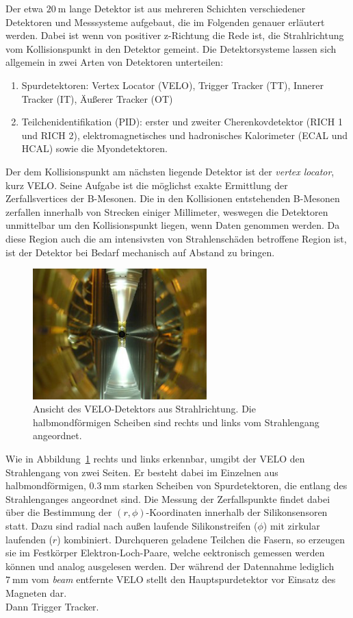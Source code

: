 %
Der etwa $\SI{20}{\meter}$ lange Detektor ist aus mehreren Schichten verschiedener Detektoren und Messsysteme aufgebaut, die im Folgenden genauer erläutert werden. Dabei ist wenn von positiver z-Richtung die Rede ist, die Strahlrichtung vom Kollisionspunkt in den Detektor gemeint. Die Detektorsysteme lassen sich allgemein in zwei Arten von Detektoren unterteilen:
%
\begin{enumerate}
  \item Spurdetektoren: Vertex Locator (VELO), Trigger Tracker (TT), Innerer Tracker (IT), Äußerer Tracker (OT)
  \item Teilchenidentifikation (PID): erster und zweiter Cherenkovdetektor (RICH 1 und RICH 2), elektromagnetisches und hadronisches Kalorimeter (ECAL und HCAL) sowie die Myondetektoren.
\end{enumerate}
%
Der dem Kollisionspunkt am nächsten liegende Detektor ist der \textit{vertex locator}, kurz VELO. Seine Aufgabe ist die möglichst exakte Ermittlung der Zerfallsvertices der B-Mesonen. Die in den Kollisionen entstehenden B-Mesonen zerfallen innerhalb von Strecken einiger Millimeter, weswegen die Detektoren unmittelbar um den Kollisionspunkt liegen, wenn Daten genommen werden\cite{velo}. Da diese Region auch die am intensivsten von Strahlenschäden betroffene Region ist, ist der Detektor bei Bedarf mechanisch auf Abstand zu bringen.
%
\begin{figure}[H]
  \centering
      \includegraphics[width=0.6\textwidth]{Plots/VELO-beam-view.jpg}
  \caption{Ansicht des VELO-Detektors aus Strahlrichtung. Die halbmondförmigen Scheiben sind rechts und links vom Strahlengang angeordnet\cite{velo}.}
  \label{fig:velo}
\end{figure}
%
Wie in Abbildung~\ref{fig:velo} rechts und links erkennbar, umgibt der VELO den Strahlengang von zwei Seiten. Er besteht dabei im Einzelnen aus halbmondförmigen, $\SI{0.3}{\milli\meter}$ starken Scheiben von Spurdetektoren, die entlang des Strahlenganges angeordnet sind\cite{velo}. Die Messung der Zerfallspunkte findet dabei über die Bestimmung der $(r, \phi)$-Koordinaten innerhalb der Silikonsensoren statt. Dazu sind radial nach außen laufende Silikonstreifen ($\phi$) mit zirkular laufenden ($r$) kombiniert\cite{lhcb}. Durchqueren geladene Teilchen die Fasern, so erzeugen sie im Festkörper Elektron-Loch-Paare, welche eektronisch gemessen werden können und analog ausgelesen werden. Der während der Datennahme lediglich $\SI{7}{\milli\meter}$ vom \textit{beam} entfernte VELO stellt den Hauptspurdetektor vor Einsatz des Magneten dar\cite{velo}. \\
%
Dann Trigger Tracker.
